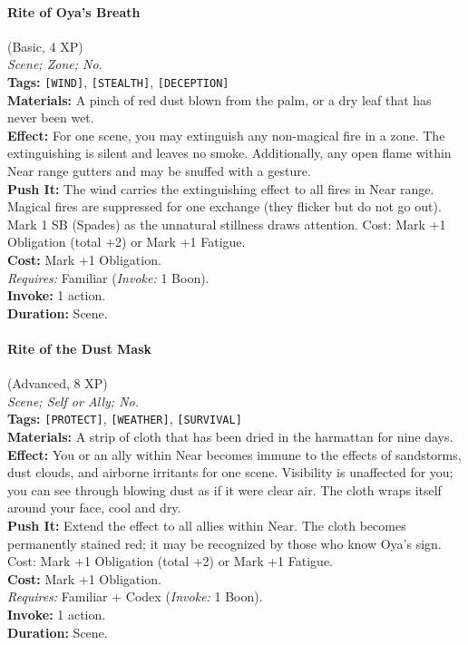 \paragraph{Rite of Oya's Breath} (Basic, 4 XP) \hfill \\
\emph{Scene; Zone; No.} \\
\textbf{Tags:} \texttt{[WIND]}, \texttt{[STEALTH]}, \texttt{[DECEPTION]} \\
\textbf{Materials:} A pinch of red dust blown from the palm, or a dry leaf that has never been wet. \\
\textbf{Effect:} For one scene, you may extinguish any non-magical fire in a zone. The extinguishing is silent and leaves no smoke. Additionally, any open flame within Near range gutters and may be snuffed with a gesture. \\
\textbf{Push It:} The wind carries the extinguishing effect to all fires in Near range. Magical fires are suppressed for one exchange (they flicker but do not go out). Mark 1 SB (Spades) as the unnatural stillness draws attention. Cost: Mark +1 Obligation (total +2) or Mark +1 Fatigue. \\
\textbf{Cost:} Mark +1 Obligation. \\
\textit{Requires:} Familiar (\textit{Invoke:} 1 Boon). \\
\textbf{Invoke:} 1 action. \\
\textbf{Duration:} Scene.

\paragraph{Rite of the Dust Mask} (Advanced, 8 XP) \hfill \\
\emph{Scene; Self or Ally; No.} \\
\textbf{Tags:} \texttt{[PROTECT]}, \texttt{[WEATHER]}, \texttt{[SURVIVAL]} \\
\textbf{Materials:} A strip of cloth that has been dried in the harmattan for nine days. \\
\textbf{Effect:} You or an ally within Near becomes immune to the effects of sandstorms, dust clouds, and airborne irritants for one scene. Visibility is unaffected for you; you can see through blowing dust as if it were clear air. The cloth wraps itself around your face, cool and dry. \\
\textbf{Push It:} Extend the effect to all allies within Near. The cloth becomes permanently stained red; it may be recognized by those who know Oya's sign. Cost: Mark +1 Obligation (total +2) or Mark +1 Fatigue. \\
\textbf{Cost:} Mark +1 Obligation. \\
\textit{Requires:} Familiar + Codex (\textit{Invoke:} 1 Boon). \\
\textbf{Invoke:} 1 action. \\
\textbf{Duration:} Scene.

